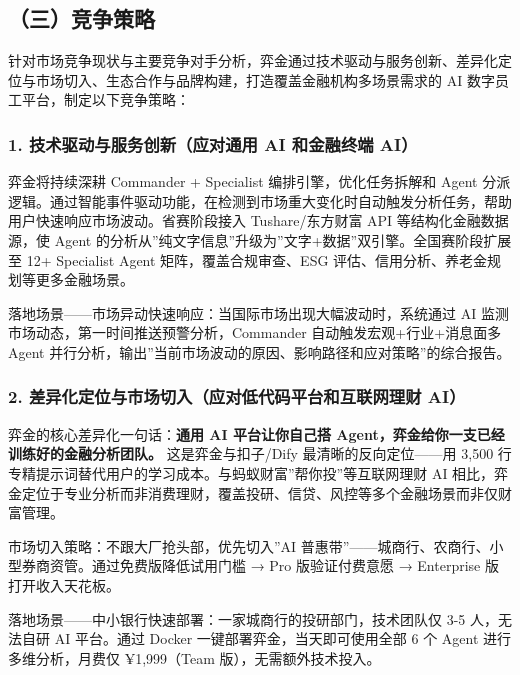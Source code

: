 \documentclass[
]{ctexart}
\begin{document}
\subsection{（三）竞争策略}\label{ux4e09ux7adeux4e89ux7b56ux7565}

针对市场竞争现状与主要竞争对手分析，弈金通过技术驱动与服务创新、差异化定位与市场切入、生态合作与品牌构建，打造覆盖金融机构多场景需求的
AI 数字员工平台，制定以下竞争策略：

\subsubsection{1. 技术驱动与服务创新（应对通用 AI 和金融终端
AI）}\label{ux6280ux672fux9a71ux52a8ux4e0eux670dux52a1ux521bux65b0ux5e94ux5bf9ux901aux7528-ai-ux548cux91d1ux878dux7ec8ux7aef-ai}

弈金将持续深耕 Commander + Specialist 编排引擎，优化任务拆解和 Agent
分派逻辑。通过智能事件驱动功能，在检测到市场重大变化时自动触发分析任务，帮助用户快速响应市场波动。省赛阶段接入
Tushare/东方财富 API 等结构化金融数据源，使 Agent
的分析从''纯文字信息''升级为''文字+数据''双引擎。全国赛阶段扩展至 12+
Specialist Agent 矩阵，覆盖合规审查、ESG
评估、信用分析、养老金规划等更多金融场景。

落地场景------市场异动快速响应：当国际市场出现大幅波动时，系统通过 AI
监测市场动态，第一时间推送预警分析，Commander 自动触发宏观+行业+消息面多
Agent
并行分析，输出''当前市场波动的原因、影响路径和应对策略''的综合报告。

\subsubsection{2. 差异化定位与市场切入（应对低代码平台和互联网理财
AI）}\label{ux5deeux5f02ux5316ux5b9aux4f4dux4e0eux5e02ux573aux5207ux5165ux5e94ux5bf9ux4f4eux4ee3ux7801ux5e73ux53f0ux548cux4e92ux8054ux7f51ux7406ux8d22-ai}

弈金的核心差异化一句话：\textbf{通用 AI 平台让你自己搭
Agent，弈金给你一支已经训练好的金融分析团队。} 这是弈金与扣子/Dify
最清晰的反向定位------用 3,500
行专精提示词替代用户的学习成本。与蚂蚁财富''帮你投''等互联网理财 AI
相比，弈金定位于专业分析而非消费理财，覆盖投研、信贷、风控等多个金融场景而非仅财富管理。

市场切入策略：不跟大厂抢头部，优先切入''AI
普惠带''------城商行、农商行、小型券商资管。通过免费版降低试用门槛 → Pro
版验证付费意愿 → Enterprise 版打开收入天花板。

落地场景------中小银行快速部署：一家城商行的投研部门，技术团队仅 3-5
人，无法自研 AI 平台。通过 Docker 一键部署弈金，当天即可使用全部 6 个
Agent 进行多维分析，月费仅 ¥1,999（Team 版），无需额外技术投入。
\end{document}
